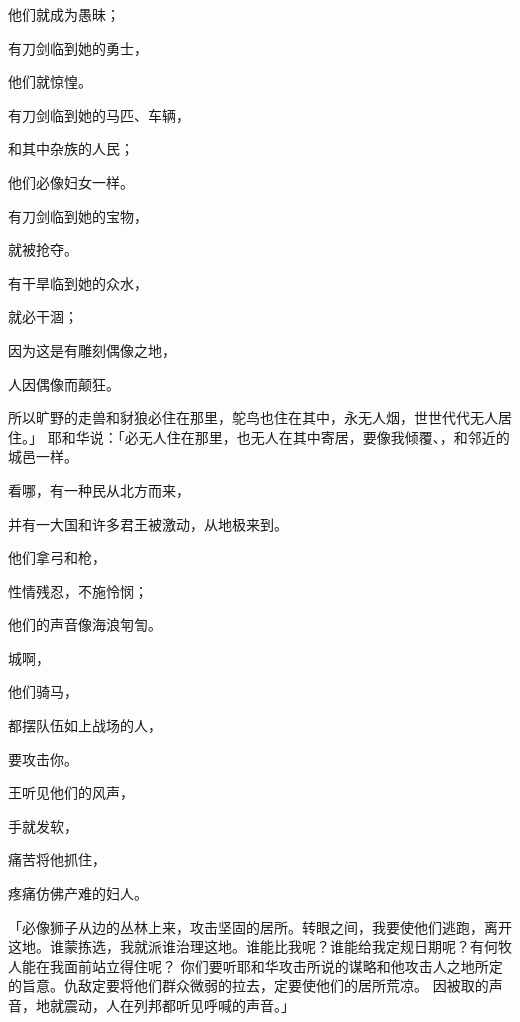 {\par }{\Q 他们就成为愚昧；
\par }{\Q 有刀剑临到她的勇士，
\par }{\Q 他们就惊惶。
\par }{\Q {}有刀剑临到她的马匹、车辆，
\par }{\Q 和其中杂族的人民；
\par }{\Q 他们必像妇女一样。
\par }{\Q 有刀剑临到她的宝物，
\par }{\Q 就被抢夺。
\par }{\Q {}有干旱临到她的众水，
\par }{\Q 就必干涸；
\par }{\Q 因为这是有雕刻偶像之地，
\par }{\Q 人因偶像而颠狂。
\par }{\MM {}所以旷野的走兽和豺狼必住在那里，鸵鸟也住在其中，永无人烟，世世代代无人居住。」
耶和华说：「必无人住在那里，也无人在其中寄居，要像我倾覆{}、{}，和邻近的城邑一样。
\par }{\Q {}看哪，有一种民从北方而来，
\par }{\Q 并有一大国和许多君王被激动，从地极来到。
\par }{\Q {}他们拿弓和枪，
\par }{\Q 性情残忍，不施怜悯；
\par }{\Q 他们的声音像海浪匉訇。
\par }{城啊，
\par }{\Q 他们骑马，
\par }{\Q 都摆队伍如上战场的人，
\par }{\Q 要攻击你。
\par }{\BB \par }{\Q {}王听见他们的风声，
\par }{\Q 手就发软，
\par }{\Q 痛苦将他抓住，
\par }{\Q 疼痛仿佛产难的妇人。
\par }{\PP {}「{}必像狮子从{}边的丛林上来，攻击坚固的居所。转眼之间，我要使他们逃跑，离开这地。谁蒙拣选，我就派谁治理这地。谁能比我呢？谁能给我定规日期呢？有何牧人能在我面前站立得住呢？
你们要听耶和华攻击{}所说的谋略和他攻击{}人之地所定的旨意。仇敌定要将他们群众微弱的拉去，定要使他们的居所荒凉。
因{}被取的声音，地就震动，人在列邦都听见呼喊的声音。」

}
